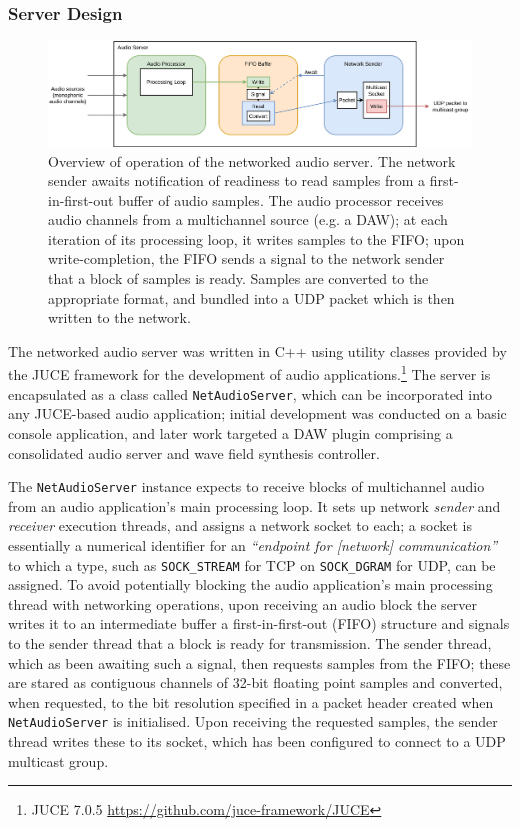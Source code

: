 \subsubsection{Server Design}

\begin{figure}[ht]
    \centering
    \includegraphics[width=\textwidth]{figures/audio-server}
    \caption{Overview of operation of the networked audio server.
    The network sender awaits notification of readiness to read samples from a
    first-in-first-out buffer of audio samples.
    The audio processor receives audio channels from a multichannel source
        (e.g. a DAW); at each iteration of its processing loop, it writes samples
        to the FIFO; upon write-completion, the FIFO sends a signal to the network
        sender that a block of samples is ready.
        Samples are converted to the appropriate format, and bundled into a UDP
        packet which is then written to the network.}
    \label{fig:audio-server}
\end{figure}

The networked audio server was written in C++ using utility classes provided by
the JUCE framework for the development of audio applications.\footnote{
    JUCE 7.0.5 \url{https://github.com/juce-framework/JUCE}
}
The server is encapsulated as a class called \texttt{NetAudioServer},
which can be incorporated into any JUCE-based audio application;
initial development was conducted on a basic console application, and later work
targeted a DAW plugin comprising a consolidated audio server and wave field
synthesis controller.

The \texttt{NetAudioServer} instance expects to receive blocks of
multichannel audio from an audio application's main processing loop.
It sets up network \textit{sender} and \textit{receiver} execution threads, and
assigns a network socket to each; a socket is essentially a numerical identifier
for an \textit{``endpoint for [network] communication''}
~\citep{noauthor_socket2_nodate} to which a type, such as \texttt{SOCK\_STREAM}
for TCP on \texttt{SOCK\_DGRAM} for UDP, can be assigned.
To avoid potentially blocking the audio application's main processing thread
with networking operations, upon receiving an audio block the server writes it
to an intermediate buffer \textemdash{} a first-in-first-out (FIFO) structure
\textemdash{} and signals to the sender thread that a block is ready for
transmission.
The sender thread, which as been awaiting such a signal, then requests samples
from the FIFO; these are stared as contiguous channels of 32-bit floating point
samples and converted, when requested, to the bit resolution specified in a
packet header created when \texttt{NetAudioServer} is initialised.
Upon receiving the requested samples, the sender thread writes these to its
socket, which has been configured to connect to a UDP multicast group.

